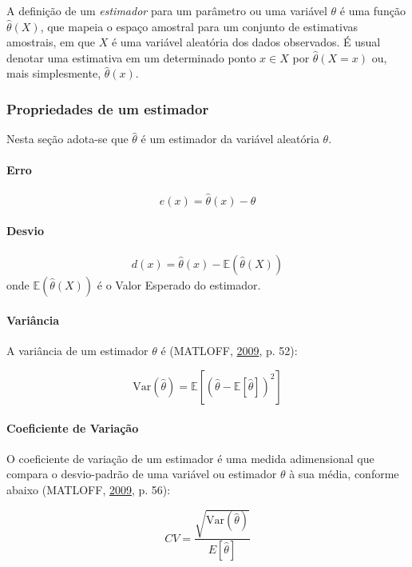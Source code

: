 \documentclass[a4paper, 12pt]{article}
\let\oldparagraph\paragraph
\renewcommand{\paragraph}[1]{\oldparagraph{#1}\mbox{}}
\begin{document}
A definição de um \emph{estimador} para um parâmetro ou uma variável
\(\theta\) é uma função \(\hat{\theta}(X)\), que mapeia o espaço
amostral para um conjunto de estimativas amostrais, em que \(X\) é uma
variável aleatória dos dados observados. É usual denotar uma estimativa
em um determinado ponto \(x \in X\) por \(\hat{\theta}(X = x)\) ou, mais
simplesmente, \(\hat{\theta}(x)\).

\subsubsection{Propriedades de um
estimador}\label{propriedades-de-um-estimador}

Nesta seção adota-se que \(\hat{\theta}\) é um estimador da variável
aleatória \(\theta\).

\paragraph{Erro}\label{erro}

\[e(x) = \hat{\theta}(x) - \theta\]

\paragraph{Desvio}\label{desvio}

\[d(x) = \hat{\theta}(x) - \mathbb{E}(\hat{\theta}(X))\] onde
\(\mathbb{E}(\hat{\theta}(X))\) é o Valor Esperado do estimador.

\paragraph{Variância}\label{variancia}

A variância de um estimador \(\theta\) é (MATLOFF,
\protect\hyperlink{ref-matloff2009}{2009}, p. 52):

\[\text{Var}(\hat{\theta}) = \mathbb{E}[(\hat{\theta} - \mathbb{E}[\hat{\theta}])^2]\]

\paragraph{Coeficiente de Variação}\label{coeficiente-de-variacao}

O coeficiente de variação de um estimador é uma medida adimensional que
compara o desvio-padrão de uma variável ou estimador \(\theta\) à sua
média, conforme abaixo (MATLOFF,
\protect\hyperlink{ref-matloff2009}{2009}, p. 56):

\[CV = \frac{\sqrt{\text{Var}(\hat{\theta})}}{E[\hat{\theta}]}\]
\end{document}
